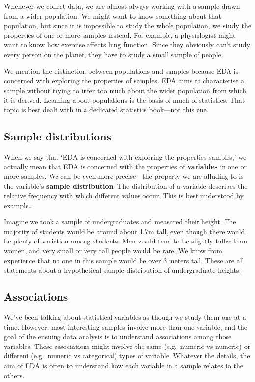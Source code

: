 \documentclass[
]{book}
\begin{document}
Whenever we collect data, we are almost always working with a sample drawn from a wider population. We might want to know something about that population, but since it is impossible to study the whole population, we study the properties of one or more samples instead. For example, a physiologist might want to know how exercise affects lung function. Since they obviously can't study every person on the planet, they have to study a small sample of people.

We mention the distinction between populations and samples because EDA is concerned with exploring the properties of samples. EDA aims to characterise a sample without trying to infer too much about the wider population from which it is derived. Learning about populations is the basis of much of statistics. That topic is best dealt with in a dedicated statistics book---not this one.

\hypertarget{sample-distributions}{%
\subsection{Sample distributions}\label{sample-distributions}}

When we say that `EDA is concerned with exploring the properties samples,' we actually mean that EDA is concerned with the properties of \textbf{variables} in one or more samples. We can be even more precise---the property we are alluding to is the variable's \textbf{sample distribution}. The distribution of a variable describes the relative frequency with which different values occur. This is best understood by example\ldots{}

Imagine we took a sample of undergraduates and measured their height. The majority of students would be around about 1.7m tall, even though there would be plenty of variation among students. Men would tend to be slightly taller than women, and very small or very tall people would be rare. We know from experience that no one in this sample would be over 3 meters tall. These are all statements about a hypothetical sample distribution of undergraduate heights.

\hypertarget{associations}{%
\subsection{Associations}\label{associations}}

We've been talking about statistical variables as though we study them one at a time. However, most interesting samples involve more than one variable, and the goal of the ensuing data analysis is to understand associations among those variables. These associations might involve the same (e.g.~numeric vs numeric) or different (e.g.~numeric vs categorical) types of variable. Whatever the details, the aim of EDA is often to understand how each variable in a sample relates to the others.
\end{document}
